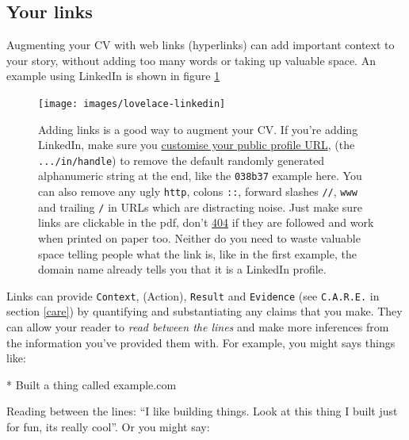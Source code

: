 \documentclass[
]{book}
\newenvironment{Shaded}{\begin{snugshade}}{\end{snugshade}}
\newcommand{\NormalTok}[1]{#1}
\newcommand{\SpecialStringTok}[1]{\textcolor[rgb]{0.31,0.60,0.02}{#1}}
\begin{document}
\hypertarget{links}{%
\subsection{Your links}\label{links}}

Augmenting your CV with web links (hyperlinks) can add important context to your story, without adding too many words or taking up valuable space. An example using LinkedIn is shown in figure \ref{fig:lovelace-fig}

\begin{figure}

{\centering \texttt{[image: images/lovelace-linkedin]} 

}

\caption{Adding links is a good way to augment your CV. If you're adding LinkedIn, make sure you \href{https://www.linkedin.com/help/linkedin/topics/6042/6054/87}{customise your public profile URL}, (the \texttt{.../in/handle}) to remove the default randomly generated alphanumeric string at the end, like the \texttt{038b37} example here. \citep{customlinkedin} You can also remove any ugly \texttt{http}, colons \texttt{::}, forward slashes \texttt{//}, \texttt{www} and trailing \texttt{/} in URLs which are distracting noise. Just make sure links are clickable in the pdf, don't \href{https://en.wikipedia.org/wiki/HTTP_404}{404} if they are followed and work when printed on paper too. Neither do you need to waste valuable space telling people what the link is, like in the first example, the domain name already tells you that it is a LinkedIn profile.}\label{fig:lovelace-fig}
\end{figure}



Links can provide \texttt{Context}, (Action), \texttt{Result} and \texttt{Evidence} (see \texttt{C.A.R.E.} in section \ref{care}) by quantifying and substantiating any claims that you make. They can allow your reader to \emph{read between the lines} and make more inferences from the information you've provided them with. For example, you might says things like:

\begin{Shaded}
\begin{Highlighting}[]
\SpecialStringTok{* }\NormalTok{Built a thing called example.com}
\end{Highlighting}
\end{Shaded}

Reading between the lines: ``I like building things. Look at this thing I built just for fun, its really cool''. Or you might say:
\end{document}
